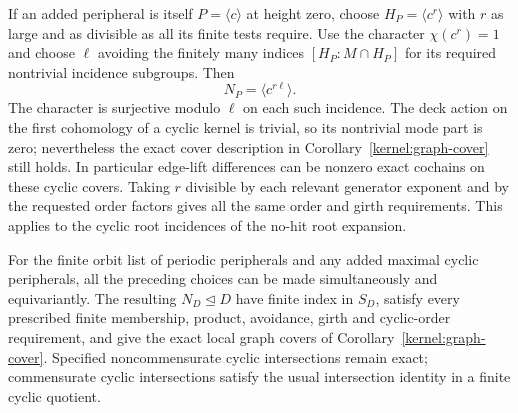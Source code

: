 \begin{remark}\label{kernel:cyclic-peripheral}
If an added peripheral is itself \(P=\langle c\rangle\) at height
zero, choose \(H_P=\langle c^r\rangle\) with \(r\) as large and as
divisible as all its finite tests require.  Use the character
\(\chi(c^r)=1\) and choose \(\ell\) avoiding the finitely many indices
\([H_P:M\cap H_P]\) for its required nontrivial incidence subgroups.
Then
\[
                              N_P=\langle c^{r\ell}\rangle .
\]
The character is surjective modulo \(\ell\) on each such incidence.
The deck action on the first cohomology of a cyclic kernel is
trivial, so its nontrivial mode part is zero; nevertheless the exact
cover description in Corollary~\ref{kernel:graph-cover} still holds.
In particular edge-lift differences can be nonzero exact cochains
on these cyclic covers.  Taking \(r\) divisible by each relevant
generator exponent and by the requested order factors gives all
the same order and girth requirements.  This applies to the cyclic
root incidences of the no-hit root expansion.
\end{remark}

\begin{proposition}\label{kernel:construction}
For the finite orbit list of periodic peripherals and any added
maximal cyclic peripherals, all the preceding choices can be made
simultaneously and equivariantly.  The resulting \(N_D\unlhd D\)
have finite index in \(S_D\), satisfy every prescribed finite
membership, product, avoidance, girth and cyclic-order requirement,
and give the exact local graph covers of
Corollary~\ref{kernel:graph-cover}.  Specified noncommensurate cyclic
intersections remain exact; commensurate cyclic intersections satisfy
the usual intersection identity in a finite cyclic quotient.
\end{proposition}

